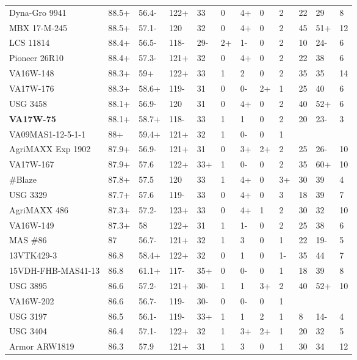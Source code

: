\documentclass[12pt, letterpaper]{article}
\begin{document}
\begin{landscape}
\begin{ThreePartTable}
\begin{longtable}{llllllllllll}
  Dyna-Gro 9941 & 88.5+ & 56.4- & 122+ & 33 & 0 & 4+ & 0 & 2 & 22 & 29 & 8 \\ 
  MBX 17-M-245 & 88.5+ & 57.1- & 120 & 32 & 0 & 4+ & 0 & 2 & 45 & 51+ & 12 \\ 
  LCS 11814 & 88.4+ & 56.5- & 118- & 29- & 2+ & 1- & 0 & 2 & 10 & 24- & 6 \\ 
  Pioneer 26R10 & 88.4+ & 57.3- & 121+ & 32 & 0 & 4+ & 0 & 2 & 22 & 38 & 6 \\ 
  VA16W-148 & 88.3+ & 59+ & 122+ & 33 & 1 & 2 & 0 & 2 & 35 & 35 & 14 \\ 
  VA17W-176 & 88.3+ & 58.6+ & 119- & 31 & 0 & 0- & 2+ & 1 & 25 & 40 & 6 \\ 
  USG 3458 & 88.1+ & 56.9- & 120 & 31 & 0 & 4+ & 0 & 2 & 40 & 52+ & 6 \\ 
  \textbf{VA17W-75} & 88.1+ & 58.7+ & 118- & 33 & 1 & 1 & 0 & 2 & 20 & 23- & 3 \\ 
  VA09MAS1-12-5-1-1 & 88+ & 59.4+ & 121+ & 32 & 1 & 0- & 0 & 1 &  &  &  \\ 
  AgriMAXX Exp 1902 & 87.9+ & 56.9- & 121+ & 31 & 0 & 3+ & 2+ & 2 & 25 & 26- & 10 \\ 
  VA17W-167 & 87.9+ & 57.6 & 122+ & 33+ & 1 & 0- & 0 & 2 & 35 & 60+ & 10 \\ 
  \#Blaze & 87.8+ & 57.5 & 120 & 33 & 1 & 4+ & 0 & 3+ & 30 & 39 & 4 \\ 
  USG 3329 & 87.7+ & 57.6 & 119- & 33 & 0 & 4+ & 0 & 3 & 18 & 39 & 7 \\ 
  AgriMAXX 486 & 87.3+ & 57.2- & 123+ & 33 & 0 & 4+ & 1 & 2 & 30 & 32 & 10 \\ 
  VA16W-149 & 87.3+ & 58 & 122+ & 31 & 1 & 1- & 0 & 2 & 25 & 38 & 6 \\ 
  MAS \#86 & 87 & 56.7- & 121+ & 32 & 1 & 3 & 0 & 1 & 22 & 19- & 5 \\ 
  13VTK429-3 & 86.8 & 58.4+ & 122+ & 32 & 0 & 1 & 0 & 1- & 35 & 44 & 7 \\ 
  15VDH-FHB-MAS41-13 & 86.8 & 61.1+ & 117- & 35+ & 0 & 0- & 0 & 1 & 18 & 39 & 8 \\ 
  USG 3895 & 86.6 & 57.2- & 121+ & 30- & 1 & 1 & 3+ & 2 & 40 & 52+ & 10 \\ 
  VA16W-202 & 86.6 & 56.7- & 119- & 30- & 0 & 0- & 0 & 1 &  &  &  \\ 
  USG 3197 & 86.5 & 56.1- & 119- & 33+ & 1 & 1 & 2 & 1 & 8 & 14- & 4 \\ 
  USG 3404 & 86.4 & 57.1- & 122+ & 32 & 1 & 3+ & 2+ & 1 & 20 & 32 & 5 \\ 
  Armor ARW1819 & 86.3 & 57.9 & 121+ & 31 & 1 & 3 & 0 & 1 & 30 & 34 & 12 \\ 

\end{longtable}
\end{ThreePartTable}
\end{landscape}
\end{document}

